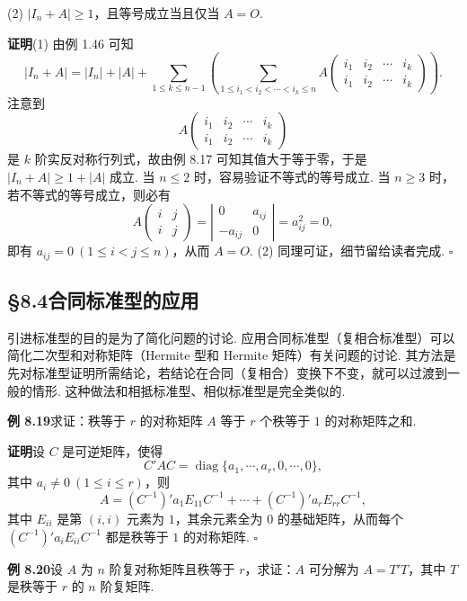 \documentclass[UTF8,12pt,a4paper,fontset=fandol]{ctexart}
\begin{document}
(2) $|I_n+A|\ge 1$，且等号成立当且仅当 $A=O$.

\noindent\textbf{证明}\quad (1) 由例 1.46 可知
\[
|I_n+A|=|I_n|+|A|+\sum_{1\le k\le n-1}\left(\sum_{1\le i_1<i_2<\cdots<i_k\le n}
A\left(\begin{array}{cccc}
i_1 & i_2 & \cdots & i_k\\
i_1 & i_2 & \cdots & i_k
\end{array}\right)\right).
\]
注意到
\[
A\left(\begin{array}{cccc}
i_1 & i_2 & \cdots & i_k\\
i_1 & i_2 & \cdots & i_k
\end{array}\right)
\]
是 $k$ 阶实反对称行列式，故由例 8.17 可知其值大于等于零，于是 $|I_n+A|\ge 1+|A|$ 成立. 当 $n\le 2$ 时，容易验证不等式的等号成立. 当 $n\ge 3$ 时，若不等式的等号成立，则必有
\[
A\left(\begin{array}{cc}
i & j\\
i & j
\end{array}\right)
=
\left|\begin{array}{cc}
0 & a_{ij}\\
-a_{ij} & 0
\end{array}\right|=a_{ij}^2=0,
\]
即有 $a_{ij}=0\ (1\le i<j\le n)$，从而 $A=O$. (2) 同理可证，细节留给读者完成. $\ensuremath{\square}$

\subsection*{§8.4\quad 合同标准型的应用}

引进标准型的目的是为了简化问题的讨论. 应用合同标准型（复相合标准型）可以简化二次型和对称矩阵（Hermite 型和 Hermite 矩阵）有关问题的讨论. 其方法是先对标准型证明所需结论，若结论在合同（复相合）变换下不变，就可以过渡到一般的情形. 这种做法和相抵标准型、相似标准型是完全类似的.

\noindent\textbf{例 8.19}\quad 求证：秩等于 $r$ 的对称矩阵 $A$ 等于 $r$ 个秩等于 $1$ 的对称矩阵之和.

\noindent\textbf{证明}\quad 设 $C$ 是可逆矩阵，使得
\[
C'AC=\operatorname{diag}\{a_1,\cdots,a_r,0,\cdots,0\},
\]
其中 $a_i\ne 0\ (1\le i\le r)$，则
\[
A=(C^{-1})'a_1E_{11}C^{-1}+\cdots+(C^{-1})'a_rE_{rr}C^{-1},
\]
其中 $E_{ii}$ 是第 $(i,i)$ 元素为 $1$，其余元素全为 $0$ 的基础矩阵，从而每个 $(C^{-1})'a_iE_{ii}C^{-1}$ 都是秩等于 $1$ 的对称矩阵. $\ensuremath{\square}$

\noindent\textbf{例 8.20}\quad 设 $A$ 为 $n$ 阶复对称矩阵且秩等于 $r$，求证：$A$ 可分解为 $A=T'T$，其中 $T$ 是秩等于 $r$ 的 $n$ 阶复矩阵.
\end{document}
